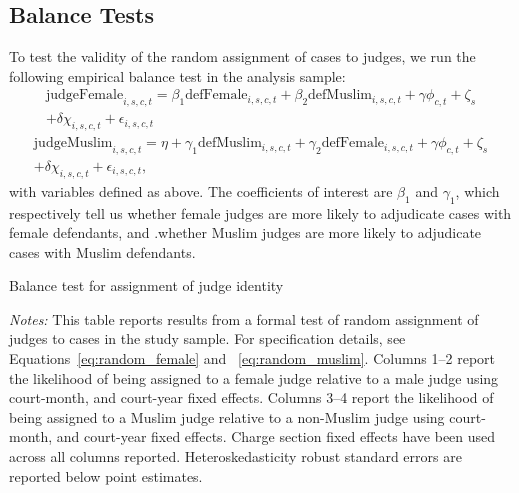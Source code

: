 \documentclass[12pt,english]{article}
\begin{document}
\subsection{Balance Tests}

To test the validity of the random assignment of cases to judges, we run the following empirical balance test in the analysis sample:
\begin{equation}
\label{eq:random_female}
    \begin{split}
          \text{judgeFemale}_{i,s,c,t} = \beta_{1} \text{defFemale}_{i,s,c,t} + \beta_{2} \text{defMuslim}_{i,s,c,t}
          + \gamma \phi_{c,t} + \zeta_{s} \\ + \delta \chi_{i,s,c,t} + \epsilon_{i,s,c,t}
    \end{split}
\end{equation}
\begin{equation}
\label{eq:random_muslim}
    \begin{split}
          \text{judgeMuslim}_{i,s,c,t} = \eta + \gamma_{1} \text{defMuslim}_{i,s,c,t} + \gamma_{2} \text{defFemale}_{i,s,c,t}
          + \gamma \phi_{c,t} + \zeta_{s} \\ + \delta \chi_{i,s,c,t} +  \epsilon_{i,s,c,t}\text{,}
    \end{split}
\end{equation}
with variables defined as above. The coefficients of interest are $\beta_{1}$ and $\gamma_{1}$, which respectively tell us whether female judges are more likely to adjudicate cases with female defendants, and .whether Muslim judges are more likely to adjudicate cases with Muslim defendants.

\begin{table}
    \begin{center}
      \caption{Balance test for assignment of judge identity}
      \label{tab:balance}
     
     \begin{minipage}{0.95\textwidth}
   {\footnotesize \emph{Notes:} This table reports results from a formal test of random assignment of judges to cases in the study sample. For specification details, see Equations~\ref{eq:random_female} and ~\ref{eq:random_muslim}. Columns 1--2 report the likelihood of being assigned to a female judge relative to a male judge using court-month, and court-year fixed effects. Columns 3--4 report the likelihood of being assigned to a Muslim judge relative to a non-Muslim judge using court-month, and court-year fixed effects. Charge section fixed effects have been used across all columns reported. Heteroskedasticity robust standard errors are reported below point estimates. } \\
   \end{minipage}
  \end{center}
   \end{table}
   
\end{document}
